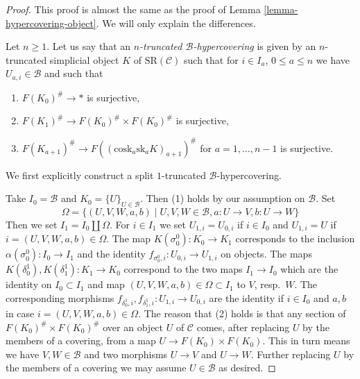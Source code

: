 \documentclass{stacks-project}
\theoremstyle{plain}
\theoremstyle{definition}
\theoremstyle{remark}
\numberwithin{equation}{subsection}
\begin{document}
\begin{proof}
This proof is almost the same as the proof of
Lemma \ref{lemma-hypercovering-object}. We will
only explain the differences.

\medskip\noindent
Let $n \geq 1$. Let us say that an
{\it $n$-truncated $\mathcal{B}$-hypercovering}
is given by an $n$-truncated simplicial
object $K$ of $\text{SR}(\mathcal{C})$
such that for $i \in I_a$, $0 \leq a \leq n$
we have $U_{a, i} \in \mathcal{B}$ and such that
\begin{enumerate}
\item $F(K_0)^\# \to *$ is surjective,
\item $F(K_1)^\# \to F(K_0)^\# \times F(K_0)^\#$ is surjective,
\item $F(K_{a + 1})^\# \to F((\text{cosk}_a \text{sk}_a K)_{a + 1})^\#$
for $a = 1, \ldots, n - 1$ is surjective.
\end{enumerate}
We first explicitly construct a split $1$-truncated $\mathcal{B}$-hypercovering.

\medskip\noindent
Take $I_0 = \mathcal{B}$ and $K_0 = \{U\}_{U \in \mathcal{B}}$.
Then (1) holds by our assumption on $\mathcal{B}$. Set
$$
\Omega =
\{(U, V, W, a, b) \mid U, V, W \in \mathcal{B}, a : U \to V, b : U \to W\}
$$
Then we set $I_1 = I_0 \amalg \Omega$. For $i \in I_1$ we set
$U_{1, i} = U_{0, i}$ if $i \in I_0$ and $U_{1, i} = U$
if $i = (U, V, W, a, b) \in \Omega$. The map
$K(\sigma^0_0) : K_0 \to K_1$ corresponds to the
inclusion $\alpha(\sigma^0_0) : I_0 \to I_1$
and the identity $f_{\sigma^0_0, i} : U_{0, i} \to U_{1, i}$
on objects. The maps $K(\delta^1_0), K(\delta^1_1) : K_1 \to K_0$
correspond to the two maps $I_1 \to I_0$ which are the
identity on $I_0 \subset I_1$ and map $(U, V, W, a, b) \in \Omega \subset I_1$
to $V$, resp.\ $W$. The corresponding morphisms
$f_{\delta^1_0, i}, f_{\delta^1_1, i} : U_{1, i} \to U_{0, i}$ are
the identity if $i \in I_0$ and $a, b$ in case $i = (U, V, W, a, b) \in \Omega$.
The reason that (2) holds is that any section of
$F(K_0)^\# \times F(K_0)^\#$ over an object $U$ of $\mathcal{C}$
comes, after replacing $U$ by the members of a covering,
from a map $U \to F(K_0) \times F(K_0)$.
This in turn means we have $V, W \in \mathcal{B}$
and two morphisms $U \to V$ and $U \to W$. Further replacing
$U$ by the members of a covering we may assume $U \in \mathcal{B}$
as desired.


\end{proof}
\end{document}
